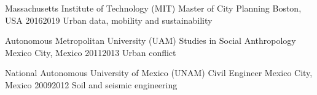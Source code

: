 
%
{Massachusetts Institute of Technology (MIT)}%
{Master of City Planning}%
{Boston, USA}%
{2016}{2019}%
{Urban data, mobility and sustainability}

%
{Autonomous Metropolitan University (UAM)}%
{Studies in Social Anthropology}%
{Mexico City, Mexico}%
{2011}{2013}%
{Urban conflict}

%
{National Autonomous University of Mexico (UNAM)}%
{Civil Engineer}%
{Mexico City, Mexico}%
{2009}{2012}%
{Soil and seismic engineering}
